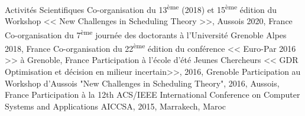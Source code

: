 \begin{rubric}{Activités Scientifiques}
\entry*[]	Co-organisation du 13\textsuperscript{ème} (2018) et 15\textsuperscript{ème} édition du Workshop << New Challenges in Scheduling Theory >>, Aussois 2020, France 
\entry*[]	Co-organisation du 7\textsuperscript{ème}  journée des doctorants à l'Université Grenoble Alpes 2018, France 
\entry*[]	Co-organisation du 22\textsuperscript{ème} édition du conférence << Euro-Par 2016 >> à Grenoble, France 
\entry*[]	Participation à l'école d'été Jeunes Chercheurs << GDR Optimisation et décision en milieur incertain>>, 2016, Grenoble 	
\entry*[]	Participation au Workshop d'Aussois "New Challenges in Scheduling Theory", 2016, Aussois, France	
\entry*[]	Participation à la 12th ACS/IEEE International Conference on Computer Systems and Applications AICCSA, 2015, Marrakech, Maroc 	
\end{rubric}
